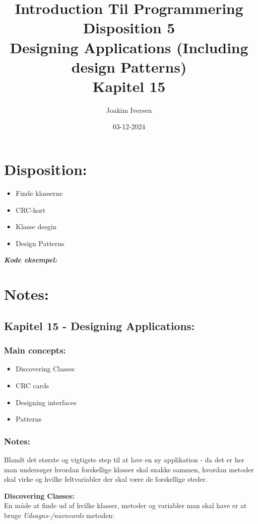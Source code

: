 \documentclass[a4paper,12pt]{article}
\title{Introduction Til Programmering \\
        Disposition 5 \\
        Designing Applications (Including design Patterns) \\
        Kapitel 15}
\author{Joakim Iversen}
\date{03-12-2024}
\newcommand{\textbfit}[1]{\textbf{\textit{#1}}}
\begin{document}
    \maketitle
\newpage

\section*{Disposition:}
\begin{itemize}
    \item Finde klasserne
    \item CRC-kort
    \item Klasse desgin
    \item Design Patterns
\end{itemize}
\newpage


\begin{center}
    \textbfit{Kode eksempel:} \\
\end{center}

\section*{Notes:}

\subsection*{Kapitel 15 - Designing Applications:}
\subsubsection*{Main concepts:}
\begin{itemize}
    \item Discovering Classes
    \item CRC cards
    \item Designing interfaces
    \item Patterns
\end{itemize}
\subsubsection*{Notes:}
Blandt det største og vigtigste step til at lave en ny applikation - da det er her man undersøger hvordan forskellige klasser skal snakke sammen, hvordan metoder skal virke og hvilke feltvariabler der skal være de forskellige steder.

\textbf{Discovering Classes:} \\
En måde at finde ud af hvilke klasser, metoder og variabler man skal have er at bruge \textit{Udsagns-/navneords} metoden:
\end{document}

